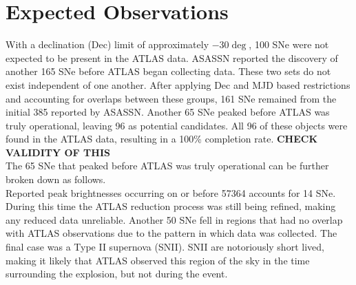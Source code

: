 \section{Expected Observations}\label{sec:expobs}

\indent With a declination (Dec) limit of approximately $-30\deg$, 100 SNe were not 
expected to be present in the ATLAS data.
ASASSN reported the discovery of another 165 SNe before ATLAS began collecting data. 
These two sets do not exist independent of one another. 
After applying Dec and MJD based restrictions and accounting for overlaps between 
these groups, 161 SNe remained from the initial 385 reported by ASASSN. 
Another 65 SNe peaked before ATLAS was truly operational, leaving 96 as potential candidates.  
All 96 of these objects were found in the ATLAS data, resulting in a 100\% completion rate.
{\bf CHECK VALIDITY OF THIS}\\
\indent The 65 SNe that peaked before ATLAS was truly operational can be further broken down as follows.\\
Reported peak brightnesses occurring on or before 57364 accounts for 14 SNe.  
During this time the ATLAS reduction process was still being refined, making 
any reduced data unreliable.  
Another 50 SNe fell in regions that had no overlap with ATLAS observations due 
to the pattern in which data was collected.  
The final case was a Type II supernova (SNII).  
SNII are notoriously short lived, making it likely that ATLAS observed this region of the sky in the 
time surrounding the explosion, but not during the event.




